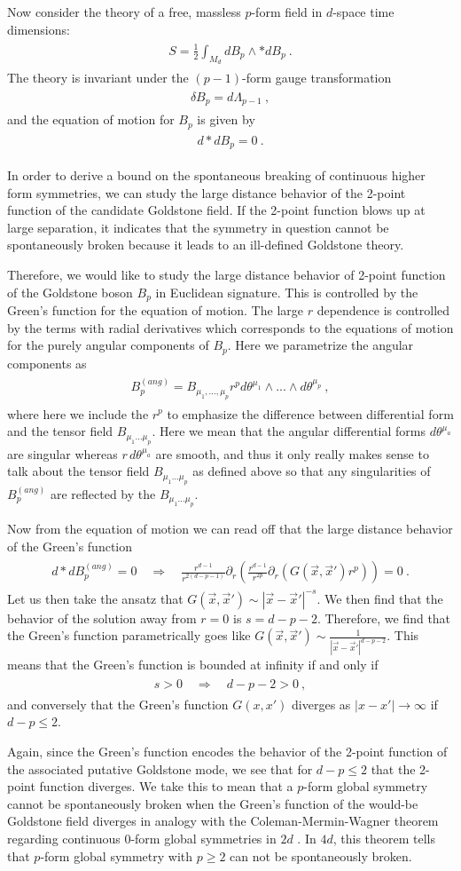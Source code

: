 \documentclass[11pt]{article}
\newcommand{\eq}[1]{\begin{align}\begin{split}#1\end{split}\end{align}}
\def\half{\frac{1}{2}}
\def\vx{{\vec{x}}}
\begin{document}
Now consider the theory of a free, massless $p$-form field in $d$-space time dimensions:
\eq{
S=\half\int_{M_d} d B_p \wedge \ast d B_p~.
}
The theory is invariant under the $(p-1)$-form gauge transformation 
\eq{
\delta B_p= d\Lambda_{p-1}~,
}
and the equation of motion for $B_p$ is given by 
\eq{
d\ast dB_p=0~.
}

In order to derive a bound on the spontaneous breaking of continuous higher form symmetries, we can study the large distance behavior of the 2-point function of the candidate Goldstone field. If the 2-point function blows up at large separation, it  indicates that the symmetry in question cannot be spontaneously broken because it leads to an ill-defined Goldstone theory. 

Therefore, we would like to study the large distance behavior of 2-point function of the Goldstone boson $B_p$ in Euclidean signature. 
This is controlled by 
the Green's function for the equation of motion. The large $r$ dependence is controlled by the terms with radial derivatives  which corresponds to the equations of motion for the purely angular components of $B_p$. Here we parametrize the angular components as 
\eq{
B_p^{(ang)}=B_{\mu_1,...,\mu_p}r^p d\theta^{\mu_1}\wedge... \wedge d\theta^{\mu_p}~,
}
where here we include the $r^p$ to emphasize the difference between differential form and the tensor field $B_{\mu_1...\mu_p}$.  Here we mean that the angular differential forms $d\theta^{\mu_a}$ are singular whereas $r \,d\theta^{\mu_a}$ are smooth, and thus it only really makes sense to talk about the tensor field $B_{\mu_1...\mu_p}$ as defined above so that any singularities of $B_p^{(ang)}$ are reflected by the $B_{\mu_1...\mu_p}$. 

Now from the equation of motion we can read off that the large distance behavior of the Green's function 
%
\eq{
 d \ast d B_p^{(ang)}=0\quad\Longrightarrow \quad \frac{r^{d-1}}{r^{2(d-p-1)}}\partial_r\left(\frac{r^{d-1}}{r^{2p}}\partial_r\left(G(\vx,\vx')r^p\right)\right)=0~.
} 
Let us then take the ansatz that $G(\vx,\vx')\sim |\vx-\vx'|^{-s}$. We then find that the behavior of the solution away from $r=0$ is $s=d-p-2$. Therefore, we find that the Green's function parametrically goes like $G(\vx,\vx')\sim \frac{1}{|\vx-\vx'|^{d-p-2}}$. This means that the 
 Green's function is bounded at infinity if and only if
\eq{
s>0\quad\Longrightarrow\quad  d-p-2>0~,
}
and conversely that the Green's function $G(x,x')$ diverges as $|x-x'|\to \infty$ if $d-p\leq 2$. 

Again, since the Green's function encodes the behavior of the 2-point function of the associated putative Goldstone mode, we see that for $d-p\leq 2$ that the 2-point function diverges. We take this to mean that a $p$-form global symmetry cannot be spontaneously broken when the Green's function of the would-be Goldstone field diverges in analogy with the Coleman-Mermin-Wagner theorem regarding continuous 0-form global symmetries in $2d$ \cite{Mermin:1966fe,Coleman:1973ci}. In $4d$, this theorem tells that $p$-form global symmetry with $p \geq 2$ can not be spontaneously broken.
\end{document}
